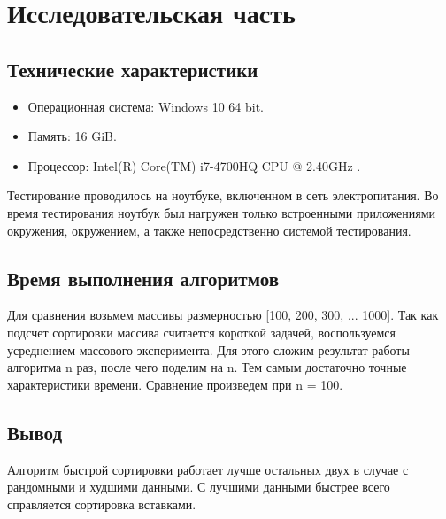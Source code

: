 \chapter{Исследовательская часть}

\section{Технические характеристики}

\begin{itemize}
	\item Операционная система: Windows 10 64 bit.
	\item Память: 16 GiB.
	\item Процессор: Intel(R) Core(TM) i7-4700HQ CPU @ 2.40GHz \cite{intel}.
\end{itemize}

Тестирование проводилось на ноутбуке, включенном в сеть электропитания. Во время тестирования ноутбук был нагружен только встроенными приложениями окружения, окружением, а также непосредственно системой тестирования.

\section{Время выполнения алгоритмов}

Для сравнения возьмем массивы размерностью [100, 200, 300, ... 1000]. Так как подсчет сортировки массива считается короткой задачей, воспользуемся усреднением массового эксперимента. Для этого сложим результат работы алгоритма n раз, после чего поделим на n. Тем самым достаточно точные характеристики времени. Сравнение произведем при n = 100. 


\clearpage
{}
\clearpage
{}


\section*{Вывод}

Алгоритм быстрой сортировки работает лучше остальных двух в случае с рандомными и худшими данными. С лучшими данными быстрее всего справляется сортировка вставками.